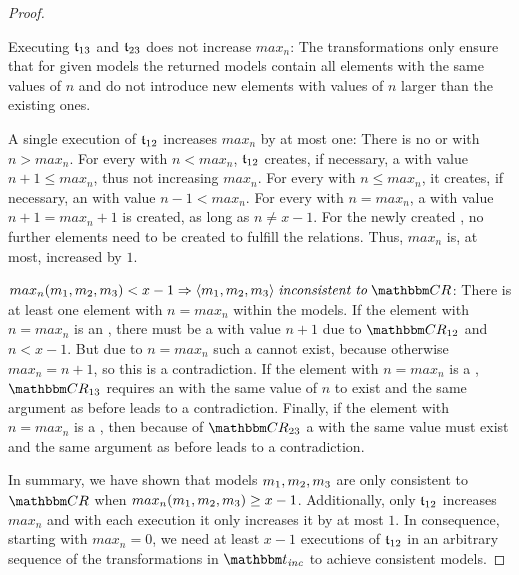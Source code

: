 \begin{proof}
    \begin{properdescription}
        \item[Executing $\transformation{t}_{13}$ and $\transformation{t}_{23}$ does not increase $max_n$:]
        The transformations only ensure that for given models the returned models contain all elements with the same values of $n$ and do not introduce new elements with values of $n$ larger than the existing ones.
        \item[A single execution of $\transformation{t}_{12}$ increases $max_n$ by at most one:]
        There is no  or  with $n > max_n$.
        For every  with $n < max_n$, $\transformation{t}_{12}$ creates, if necessary, a  with value $n + 1 \leq max_n$, thus not increasing $max_n$.
        For every  with $n \leq max_n$, it creates, if necessary, an  with value $n-1 < max_n$.
        For every  with $n = max_n$, a  with value $n+1 = max_n + 1$ is created, as long as $n \neq x-1$.
        For the newly created , no further elements need to be created to fulfill the relations.
        Thus, $max_n$ is, at most, increased by $1$.
        \item[$max_n(\model{m}{1},\model{m}{2},\model{m}{3}) < x-1 \Rightarrow \tupled{\model{m}{1},\model{m}{2},\model{m}{3}} \mathtextspacearound{inconsistent to} \consistencyrelationset{CR}$:]
        There is at least one element with $n = max_n$ within the models.
        If the element with $n = max_n$ is an , there must be a  with value $n+1$ due to $\consistencyrelationset{CR}_{12}$ and $n < x-1$.
        But due to $n = max_n$ such a  cannot exist, because otherwise $max_n = n+1$, so this is a contradiction. 
        If the element with $n = max_n$ is a , $\consistencyrelationset{CR}_{13}$ requires an  with the same value of $n$ to exist and the same argument as before leads to a contradiction.
        Finally, if the element with $n = max_n$ is a , then because of $\consistencyrelationset{CR}_{23}$ a  with the same value must exist and the same argument as before leads to a contradiction.
    \end{properdescription}

    In summary, we have shown that models $\model{m}{1},\model{m}{2},\model{m}{3}$ are only consistent to $\consistencyrelationset{CR}$ when $max_n(\model{m}{1},\model{m}{2},\model{m}{3}) \geq x-1$.
    Additionally, only $\transformation{t}_{12}$ increases $max_n$ and with each execution it only increases it by at most $1$.
    In consequence, starting with $max_n = 0$, we need at least $x-1$ executions of $\transformation{t}_{12}$ in an arbitrary sequence of the transformations in $\transformationset{T}_\mathvariable{inc}$ to achieve consistent models.
\end{proof}

